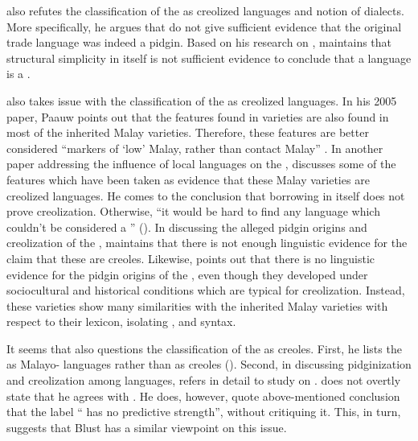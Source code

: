 \citet{Gil.2001} also refutes the classification of the  as creolized languages and {} notion of  dialects. More specifically, he argues that \cite{Adelaar.1996} do not give sufficient evidence that the original trade language was indeed a pidgin. Based on his research on , \citet{Gil.2001} maintains that structural simplicity in itself is not sufficient evidence to conclude that a language is a .



\citet{Paauw.2005,Paauw.2007,Paauw.2009,Paauw.2013} also takes issue with the classification of the  as creolized languages. In his 2005 paper, {Paauw }points out that the features found in  varieties \citep{Adelaar.1996} are also found in most of the inherited Malay varieties. Therefore, these features are better considered  ``markers of ‘low’ Malay, rather than contact Malay'' {\citep[17]{Paauw.2005}}. In another paper addressing the influence of local languages on the , {\citet{Paauw.2007}} discusses some of the features which have been taken as evidence that these Malay varieties are creolized languages. He comes to the conclusion that borrowing in itself does not prove creolization. Otherwise,  ``it would be hard to find any language which couldn’t be considered a '' (\citeyear*[3]{Paauw.2007}). In discussing the alleged pidgin origins and creolization of the , {\citet[26]{Paauw.2009}} maintains that there is not enough linguistic evidence for the claim that these are creoles. Likewise, {\citet[11]{Paauw.2013}} points out that there is no linguistic evidence for the pidgin origins of the , even though they developed under sociocultural and historical conditions which are typical for creolization. Instead, these varieties show many similarities with the inherited Malay varieties with respect to their lexicon, isolating , and syntax.



It seems that \citet{Blust.2013} also questions the classification of the  as creoles. First, he lists the  as Malayo- languages rather than as creoles (\citeyear*[xxvii]{Blust.2013}). Second, in discussing pidg\-inization and creolization among  languages, \citet[65–-66]{Blust.2013} refers in detail to  study on . \citeauthor{Blust.2013} does not overtly state that he agrees with \citeauthor{Collins.1980}. He does, however, quote  above-mentioned conclusion that the label  `` has no predictive strength'', without critiquing it. This, in turn, suggests that {Blust} has a similar viewpoint on this issue.



